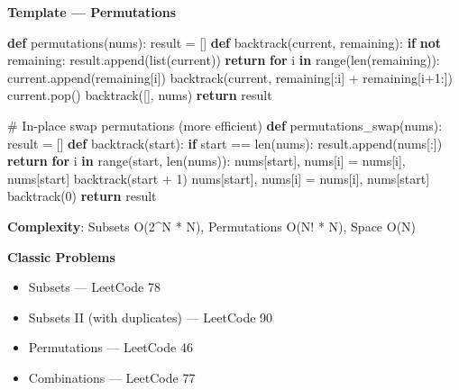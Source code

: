 \documentclass[11pt]{article}
\providecommand{\tightlist}{\setlength{\itemsep}{1pt}\setlength{\parskip}{0pt}}
\newenvironment{Shaded}{\begin{snugshade}}{\end{snugshade}}
\newcommand{\BuiltInTok}[1]{\textcolor[rgb]{0.50,0.55,0.55}{#1}}
\newcommand{\CommentTok}[1]{\textcolor[rgb]{0.48,0.49,0.49}{#1}}
\newcommand{\ControlFlowTok}[1]{\textcolor[rgb]{0.99,0.74,0.29}{\textbf{#1}}}
\newcommand{\DecValTok}[1]{\textcolor[rgb]{0.96,0.45,0.00}{#1}}
\newcommand{\KeywordTok}[1]{\textcolor[rgb]{0.81,0.81,0.76}{\textbf{#1}}}
\newcommand{\NormalTok}[1]{\textcolor[rgb]{0.81,0.81,0.76}{#1}}
\newcommand{\OperatorTok}[1]{\textcolor[rgb]{0.81,0.81,0.76}{#1}}
\begin{document}
\textbf{Template --- Permutations}


\begin{Shaded}
\begin{Highlighting}[]
\KeywordTok{def}\NormalTok{ permutations(nums):}
\NormalTok{    result }\OperatorTok{=}\NormalTok{ []}
    \KeywordTok{def}\NormalTok{ backtrack(current, remaining):}
        \ControlFlowTok{if} \KeywordTok{not}\NormalTok{ remaining:}
\NormalTok{            result.append(}\BuiltInTok{list}\NormalTok{(current))}
            \ControlFlowTok{return}
        \ControlFlowTok{for}\NormalTok{ i }\KeywordTok{in} \BuiltInTok{range}\NormalTok{(}\BuiltInTok{len}\NormalTok{(remaining)):}
\NormalTok{            current.append(remaining[i])}
\NormalTok{            backtrack(current, remaining[:i] }\OperatorTok{+}\NormalTok{ remaining[i}\OperatorTok{+}\DecValTok{1}\NormalTok{:])}
\NormalTok{            current.pop()}
\NormalTok{    backtrack([], nums)}
    \ControlFlowTok{return}\NormalTok{ result}

\CommentTok{\# In{-}place swap permutations (more efficient)}
\KeywordTok{def}\NormalTok{ permutations\_swap(nums):}
\NormalTok{    result }\OperatorTok{=}\NormalTok{ []}
    \KeywordTok{def}\NormalTok{ backtrack(start):}
        \ControlFlowTok{if}\NormalTok{ start }\OperatorTok{==} \BuiltInTok{len}\NormalTok{(nums):}
\NormalTok{            result.append(nums[:])}
            \ControlFlowTok{return}
        \ControlFlowTok{for}\NormalTok{ i }\KeywordTok{in} \BuiltInTok{range}\NormalTok{(start, }\BuiltInTok{len}\NormalTok{(nums)):}
\NormalTok{            nums[start], nums[i] }\OperatorTok{=}\NormalTok{ nums[i], nums[start]}
\NormalTok{            backtrack(start }\OperatorTok{+} \DecValTok{1}\NormalTok{)}
\NormalTok{            nums[start], nums[i] }\OperatorTok{=}\NormalTok{ nums[i], nums[start]}
\NormalTok{    backtrack(}\DecValTok{0}\NormalTok{)}
    \ControlFlowTok{return}\NormalTok{ result}
\end{Highlighting}
\end{Shaded}

\textbf{Complexity}: Subsets O(2\^{}N * N), Permutations O(N! * N), Space O(N)

\textbf{Classic Problems}

\begin{itemize}
\tightlist
\item
  Subsets --- LeetCode 78
\item
  Subsets II (with duplicates) --- LeetCode 90
\item
  Permutations --- LeetCode 46
\item
  Combinations --- LeetCode 77
\end{itemize}
\end{document}
